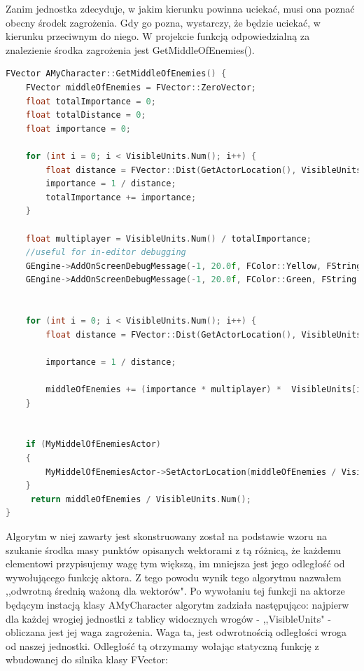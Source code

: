 \documentclass[12pt]{report}
\begin{document}
Zanim jednostka zdecyduje, w jakim kierunku powinna uciekać, musi ona poznać obecny środek zagrożenia. Gdy go pozna, wystarczy, że będzie uciekać, w kierunku przeciwnym do niego. W projekcie funkcją odpowiedzialną za znalezienie środka zagrożenia jest GetMiddleOfEnemies().

\begin{lstlisting}[language=C++, backgroundcolor=\color{black!5}, basicstyle=\footnotesize, caption=Funkcja GetMiddleOfEnemies() w klasie AMyCharacter]
FVector AMyCharacter::GetMiddleOfEnemies() {
	FVector middleOfEnemies = FVector::ZeroVector;
	float totalImportance = 0;		
	float totalDistance = 0;
	float importance = 0;

	for (int i = 0; i < VisibleUnits.Num(); i++) {
		float distance = FVector::Dist(GetActorLocation(), VisibleUnits[i]->GetActorLocation());
		importance = 1 / distance;
		totalImportance += importance;
	}

	float multiplayer = VisibleUnits.Num() / totalImportance;
	//useful for in-editor debugging
	GEngine->AddOnScreenDebugMessage(-1, 20.0f, FColor::Yellow, FString::Printf(TEXT("%f"), totalImportance));
	GEngine->AddOnScreenDebugMessage(-1, 20.0f, FColor::Green, FString::Printf(TEXT("%f"), multiplayer));


	for (int i = 0; i < VisibleUnits.Num(); i++) {
		float distance = FVector::Dist(GetActorLocation(), VisibleUnits[i]->GetActorLocation());

		importance = 1 / distance;

		middleOfEnemies += (importance * multiplayer) *  VisibleUnits[i]->GetActorLocation();
	}

	
	if (MyMiddelOfEnemiesActor)
	{
		MyMiddelOfEnemiesActor->SetActorLocation(middleOfEnemies / VisibleUnits.Num());
	}
	 return middleOfEnemies / VisibleUnits.Num();
}
\end{lstlisting}

Algorytm w niej zawarty jest skonstruowany został na podstawie wzoru na szukanie środka masy punktów opisanych wektorami z tą różnicą, że każdemu elementowi przypisujemy wagę tym większą, im mniejsza jest jego odległość od wywołującego funkcję aktora. Z tego powodu wynik tego algorytmu nazwałem ,,odwrotną średnią ważoną dla wektorów". Po wywołaniu tej funkcji na aktorze będącym instacją klasy AMyCharacter algorytm zadziała następująco:
najpierw dla każdej wrogiej jednostki z tablicy widocznych wrogów - ,,VisibleUnits" - obliczana jest jej waga zagrożenia. Waga ta, jest odwrotnością odległości wroga od naszej jednostki. Odległość tą otrzymamy wołając statyczną funkcję z wbudowanej do silnika klasy FVector:
\end{document}

